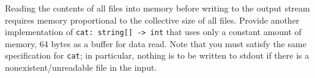 Reading the contents of all files into memory before writing to the output stream requires memory proportional to the collective size of all files.  Provide another implementation of \texttt{cat: string[] -> int} that uses only a constant amount of memory, 64 bytes as a buffer for data read.  Note that you must satisfy the same specification for \texttt{cat}; in particular, nothing is to be written to stdout if there is a nonexistent/unreadable file in the input.
